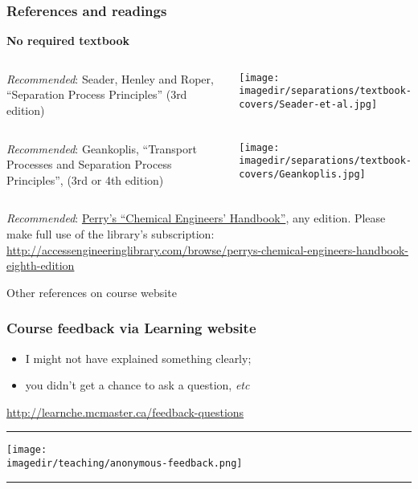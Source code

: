 \begin{frame}\frametitle{References and readings}
	
	\textbf{No required textbook}
	\begin{columns}[t]
			\emph{Recommended}: Seader, Henley and Roper, ``Separation Process Principles'' (3rd edition)
			\vspace{-1cm}
			\begin{center}
				\texttt{[image: \\imagedir/separations/textbook-covers/Seader-et-al.jpg]}
			\end{center}
	\end{columns}
	
	\vspace{12pt}
	\begin{columns}[t]
			\emph{Recommended}: Geankoplis, ``Transport Processes and Separation Process Principles'', (3rd or 4th edition)
			\vspace{-1cm}
			\begin{center}
				\texttt{[image: \\imagedir/separations/textbook-covers/Geankoplis.jpg]}
			\end{center}
	\end{columns}
	
	\vspace{12pt}	
	\emph{Recommended}: \href{http://accessengineeringlibrary.com/browse/perrys-chemical-engineers-handbook-eighth-edition}{Perry's ``Chemical Engineers' Handbook''}, any edition. Please make full use of the library's subscription: \\
	\href{http://accessengineeringlibrary.com/browse/perrys-chemical-engineers-handbook-eighth-edition}{\tiny http://accessengineeringlibrary.com/browse/perrys-chemical-engineers-handbook-eighth-edition}
	
	\vspace{24pt}
	Other references on course website
	
\end{frame}

\begin{frame}\frametitle{Course feedback via Learning website}
	\begin{itemize}
		\item	I might not have explained something clearly; 
		\item	you didn't get a chance to ask a question, \emph{etc}		
	\end{itemize}
	\href{http://learnche.mcmaster.ca/feedback-questions}{http://learnche.mcmaster.ca/feedback-questions}
	\vspace{12pt}
	\hrule
	\begin{center}
		\texttt{[image: \\imagedir/teaching/anonymous-feedback.png]}
	\end{center}
	\hrule
\end{frame}

